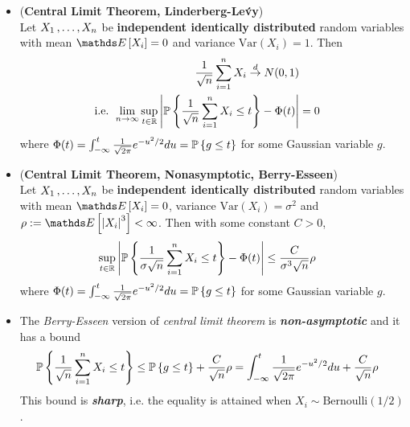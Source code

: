 \documentclass[11pt]{article}
\begin{document}
\begin{itemize}
\item \begin{theorem} (\textbf{Central Limit Theorem, Linderberg-Le{\'v}y})   \citep{vershynin2018high} \\
Let $X_1 \,{,}\ldots{,}\, X_n$ be \textbf{independent identically distributed} random variables with mean $\E{}{X_i} = 0$ and variance $\text{Var}(X_i) = 1$. Then 
\begin{align}
\frac{1}{\sqrt{n}}\sum_{i=1}^{n}X_i  \stackrel{d}{\rightarrow} N(0, 1) \label{eqn: central_limit_theorem} \\
\text{i.e. } \lim\limits_{n \to \infty}\sup_{t \in {\mathbb R}}\left\lvert {\mathbb P}\left\{\frac{1}{\sqrt{n}}\sum_{i=1}^{n}X_i \le t\right\} - \Phi(t) \right\rvert &= 0 \nonumber
\end{align} where $\Phi(t) = \int_{-\infty}^{t}\frac{1}{\sqrt{2\pi}}e^{-u^2/2}du = {\mathbb P}\left\{g \le t\right\}$ for some Gaussian variable $g$.
\end{theorem}

\item \begin{theorem} (\textbf{Central Limit Theorem, Nonasymptotic, Berry-Esseen})  \citep{vershynin2018high} \\
Let $X_1 \,{,}\ldots{,}\, X_n$ be \textbf{independent identically distributed} random variables with mean $\E{}{X_i} = 0$, variance $\text{Var}(X_i) = \sigma^2$ and $\rho := \E{}{\abs{X_i}^3} <\infty$. Then with some constant $C > 0$, 
\begin{align}
\sup_{t \in {\mathbb R}}\left\lvert {\mathbb P}\left\{\frac{1}{\sigma \sqrt{n}}\sum_{i=1}^{n}X_i \le t\right\} - \Phi(t) \right\rvert &\le  \frac{C}{ \sigma^3\sqrt{n}}\rho \label{eqn: central_limit_theorem_nonasym} 
\end{align} where $\Phi(t) = \int_{-\infty}^{t}\frac{1}{\sqrt{2\pi}}e^{-u^2/2}du = {\mathbb P}\left\{g \le t\right\}$ for some Gaussian variable $g$.
\end{theorem}

\item \begin{remark} The \emph{Berry-Esseen} version of \emph{central limit theorem} is \emph{\textbf{non-asymptotic}} and it has a bound
\begin{align*}
{\mathbb P}\left\{\frac{1}{\sqrt{n}}\sum_{i=1}^{n}X_i \le t\right\} &\le {\mathbb P}\left\{g \le t\right\} + \frac{C}{\sqrt{n}}\rho = \int_{-\infty}^{t}\frac{1}{\sqrt{2\pi}}e^{-u^2/2}du +  \frac{C}{\sqrt{n}}\rho 
\end{align*} This bound is \emph{\textbf{sharp}}, i.e. the equality is attained when $X_i \sim \text{Bernoulli}(1/2)$.
\end{remark}


\end{itemize}
\end{document}
